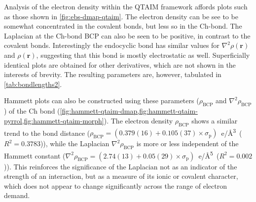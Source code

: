 \begin{refsection}
Analysis of the electron density within the QTAIM framework affords plots such as those shown in \cref{fig:ebs-dmap-qtaim}.
The electron density can be see to be somewhat concentrated in the covalent  bonds, but less so in the Ch-bond.
The Laplacian at the Ch-bond BCP can also be seen to be positive, in contrast to the covalent bonds.
Interestingly the endocyclic  bond has similar values for $\nabla^{2}\rho(\textbf{r})$ and $\rho(\textbf{r})$, suggesting that this bond is mostly electrostatic as well.
Superficially identical plots are obtained for other derivatives, which are not shown in the interests of brevity.
The resulting parameters are, however, tabulated in \cref{tab:bondlengths2}.

Hammett plots can also be constructed using these parameters ($\rho_\text{BCP}$ and $\nabla^2\rho_{\text{BCP}}$) of the Ch bond (\cref{fig:hammett-qtaim-dmap,fig:hammett-qtaim-pyrrol,fig:hammett-qtaim-morph}).
The electron density $\rho_\text{BCP}$ shows a similar trend to the bond distance ($\rho_{\text{BCP}} = (0.379(16) + 0.105(37) \times \sigma_\text{p})$~e/\AA\textsuperscript{3}~($R^2=0.3783$)), while the Laplacian $\nabla^2\rho_{\text{BCP}}$ is more or less independent of the Hammett constant ($\nabla^2\rho_{\text{BCP}} = (2.74(13) + 0.05(29) \times \sigma_\text{p})$~e/\AA\textsuperscript{5}~($R^2=0.002$)).
This reinforces the significance of the Laplacian not as an indicator of the strength of an interaction, but as a measure of its ionic or covalent character, which does not appear to change significantly across the range of electron demand.


\end{refsection}
